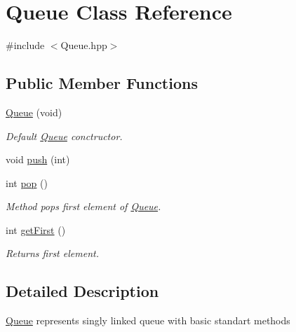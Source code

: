 \hypertarget{class_queue}{\section{Queue Class Reference}
\label{class_queue}
}


{\ttfamily \#include $<$Queue.\-hpp$>$}

\subsection*{Public Member Functions}
\begin{DoxyCompactItemize}
\item 
\hypertarget{class_queue_a04ce4d00c63bd0b6f865b31b57130ae4}{\hyperlink{class_queue_a04ce4d00c63bd0b6f865b31b57130ae4}{Queue} (void)}\label{class_queue_a04ce4d00c63bd0b6f865b31b57130ae4}

\begin{DoxyCompactList}\small\item\em Default \hyperlink{class_queue}{Queue} conctructor. \end{DoxyCompactList}\item 
void \hyperlink{class_queue_acaf504f2a36207ea194677d544ab5ae5}{push} (int)
\item 
\hypertarget{class_queue_a8a2173bd4278e94c5fbd47b5fb2c086c}{int \hyperlink{class_queue_a8a2173bd4278e94c5fbd47b5fb2c086c}{pop} ()}\label{class_queue_a8a2173bd4278e94c5fbd47b5fb2c086c}

\begin{DoxyCompactList}\small\item\em Method pops first element of \hyperlink{class_queue}{Queue}. \end{DoxyCompactList}\item 
\hypertarget{class_queue_a59fa856d33a26b72597c3288b450280f}{int \hyperlink{class_queue_a59fa856d33a26b72597c3288b450280f}{get\-First} ()}\label{class_queue_a59fa856d33a26b72597c3288b450280f}

\begin{DoxyCompactList}\small\item\em Returns first element. \end{DoxyCompactList}\end{DoxyCompactItemize}


\subsection{Detailed Description}
\hyperlink{class_queue}{Queue} represents singly linked queue with basic standart methods 

